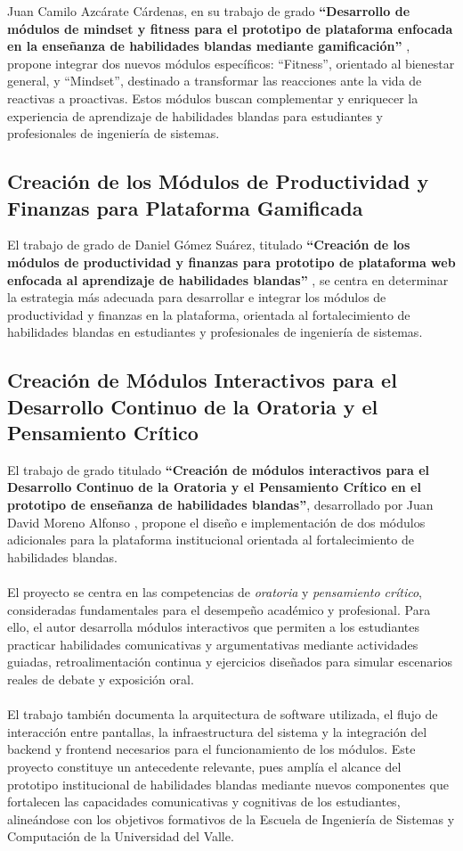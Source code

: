 Juan Camilo Azcárate Cárdenas, en su trabajo de grado \textbf{“Desarrollo de módulos de mindset y fitness para el prototipo de plataforma enfocada en la enseñanza de habilidades blandas mediante gamificación”} \cite{azcarateCardenas2024}, propone integrar dos nuevos módulos específicos: “Fitness”, orientado al bienestar general, y “Mindset”, destinado a transformar las reacciones ante la vida de reactivas a proactivas. Estos módulos buscan complementar y enriquecer la experiencia de aprendizaje de habilidades blandas para estudiantes y profesionales de ingeniería de sistemas.

\subsection{Creación de los Módulos de Productividad y Finanzas para Plataforma Gamificada}

El trabajo de grado de Daniel Gómez Suárez, titulado \textbf{“Creación de los módulos de productividad y finanzas para prototipo de plataforma web enfocada al aprendizaje de habilidades blandas”} \cite{gomezSuarez2024}, se centra en determinar la estrategia más adecuada para desarrollar e integrar los módulos de productividad y finanzas en la plataforma, orientada al fortalecimiento de habilidades blandas en estudiantes y profesionales de ingeniería de sistemas.

\subsection{Creación de Módulos Interactivos para el Desarrollo Continuo de la Oratoria y el Pensamiento Crítico}

El trabajo de grado titulado \textbf{“Creación de módulos interactivos para el Desarrollo Continuo de la Oratoria y el Pensamiento Crítico en el prototipo de enseñanza de habilidades blandas”}, desarrollado por Juan David Moreno Alfonso \cite{morenoAlfonso2025}, propone el diseño e implementación de dos módulos adicionales para la plataforma institucional orientada al fortalecimiento de habilidades blandas.
\\
\\
El proyecto se centra en las competencias de \textit{oratoria} y \textit{pensamiento crítico}, consideradas fundamentales para el desempeño académico y profesional. Para ello, el autor desarrolla módulos interactivos que permiten a los estudiantes practicar habilidades comunicativas y argumentativas mediante actividades guiadas, retroalimentación continua y ejercicios diseñados para simular escenarios reales de debate y exposición oral. 
\\
\\
El trabajo también documenta la arquitectura de software utilizada, el flujo de interacción entre pantallas, la infraestructura del sistema y la integración del backend y frontend necesarios para el funcionamiento de los módulos. Este proyecto constituye un antecedente relevante, pues amplía el alcance del prototipo institucional de habilidades blandas mediante nuevos componentes que fortalecen las capacidades comunicativas y cognitivas de los estudiantes, alineándose con los objetivos formativos de la Escuela de Ingeniería de Sistemas y Computación de la Universidad del Valle.

